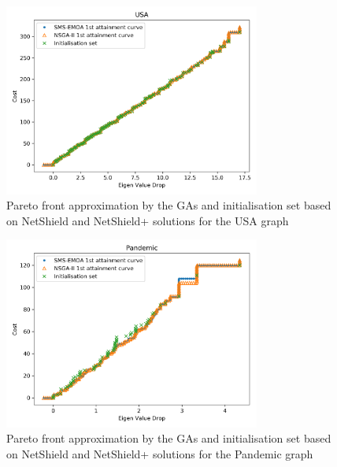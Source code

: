 \documentclass[11pt]{article}
\theoremstyle{definition}
\begin{document}
\begin{figure}[h!]
  \centering
    \includegraphics[width=0.75\textwidth]{results_ns_init/USA_attainment_nsinit}
  \caption{Pareto front approximation by the GAs and initialisation set based on NetShield and NetShield+ solutions for the USA graph}
  \label{fig:USA_atins}
\end{figure}

\begin{figure}[h!]
  \centering
    \includegraphics[width=0.75\textwidth]{results_ns_init/pandemic_attainment_nsinit}
  \caption{Pareto front approximation by the GAs and initialisation set based on NetShield and NetShield+ solutions for the Pandemic graph}
  \label{fig:Pandemic_atins}
\end{figure}
\end{document}
